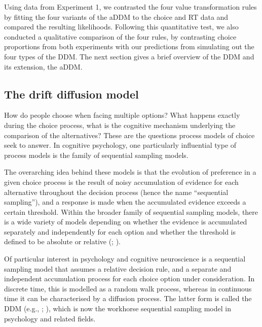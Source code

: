 \documentclass[11pt,a4paper]{article}
\begin{document}
Using data from Experiment 1, we contrasted the four value transformation rules by fitting the four variants of the aDDM to the choice and RT data and compared the resulting likelihoods. Following this quantitative test, we also conducted a qualitative comparison of the four rules, by contrasting choice proportions from both experiments with our predictions from simulating out the four types of the DDM. The next section gives a brief overview of the DDM and its extension, the aDDM.



\subsection{The drift diffusion model} \label{chap1addmexplain}


How do people choose when facing multiple options? What happens exactly during the choice process, what is the cognitive mechanism underlying the comparison of the alternatives? These are the questions process models of choice seek to answer. In cognitive psychology, one particularly influential type of process models is the family of sequential sampling models. 

The overarching idea behind these models is that the evolution of preference in a given choice process is the result of noisy accumulation of evidence for each alternative throughout the decision process (hence the name “sequential sampling”), and a response is made when the accumulated evidence exceeds a certain threshold. Within the broader family of sequential sampling models, there is a wide variety of models depending on whether the evidence is accumulated separately and independently for each option and whether the threshold is defined to be absolute or relative (; ).

Of particular interest in psychology and cognitive neuroscience is a sequential sampling model that assumes a relative decision rule, and a separate and independent accumulation process for each choice option under consideration. In discrete time, this is modelled as a random walk process, whereas in continuous time it can be characterised by a diffusion process. The latter form is called the DDM (e.g., ; ), which is now the workhorse sequential sampling model in psychology and related fields. 
\end{document}
